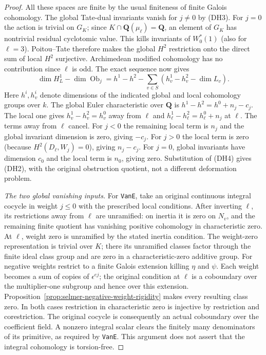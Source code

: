 \begin{proof}
All these spaces are finite by the usual finiteness of finite
Galois cohomology.  The global Tate-dual invariants vanish for
$j\ne0$ by (DH3).  For $j=0$ the action is trivial on $G_K$;
since $K\cap\mathbf Q(\mu_\ell)=\mathbf Q$, an element of $G_K$
has nontrivial residual cyclotomic value.  This kills invariants
of $W_0^*(1)$ (also for $\ell=3$).  Poitou--Tate therefore makes
the global $H^2$ restriction onto the direct sum of local
$H^2$ surjective.  Archimedean modified cohomology has no
contribution since $\ell$ is odd.  The exact sequence now gives
\[
 \dim H^1_L-\dim\operatorname{Ob}_j
 =h^1-h^2-\sum_{v\in S}(h_v^1-h_v^2-\dim L_v).                 \tag{DH5}
\]
Here $h^i,h_v^i$ denote dimensions of the indicated global and
local cohomology groups over $k$.
The global Euler characteristic over $\mathbf Q$ is
$h^1-h^2=h^0+n_j-c_j$.
The local one gives $h_v^1-h_v^2=h_v^0$ away from $\ell$
and $h_\ell^1-h_\ell^2=h_\ell^0+n_j$ at $\ell$.
The terms away from $\ell$ cancel.  For $j<0$ the remaining
local term is $n_j$ and the global invariant dimension is zero,
giving $-c_j$.  For $j>0$ the local term is zero (because
$H^2(D_\ell,W_j)=0$), giving $n_j-c_j$.
For $j=0$, global invariants have dimension $c_0$ and the local
term is $n_0$, giving zero.  Substitution of (DH4) gives (DH2),
with the original obstruction quotient, not a different
deformation problem.

\emph{The two global vanishing inputs.}
For \texttt{VanE}, take an original continuous integral cocycle
in weight $j\le0$ with the prescribed local conditions.
After inverting $\ell$, its restrictions away from $\ell$
are unramified: on inertia it is zero on $N_v$, and the remaining
finite quotient has vanishing positive cohomology in characteristic
zero.  At $\ell$, weight zero is unramified by the stated inertia
condition.  The weight-zero representation is trivial over $K$;
there its unramified classes factor through the finite ideal class
group and are zero in a characteristic-zero additive group.
For negative weights restrict to a finite Galois extension
killing $\eta$ and $\psi$.  Each weight becomes a sum of
copies of $\epsilon^{ej}$; the original condition at $\ell$
is a coboundary over the multiplier-one subgroup and hence
over this extension.  Proposition~\ref{prop:selmer-negative-weight-rigidity}
makes every resulting class zero.  In both cases restriction
in characteristic zero is injective by restriction and corestriction.
The original cocycle is consequently an actual coboundary
over the coefficient field.  A nonzero integral scalar clears
the finitely many denominators of its primitive, as required
by \texttt{VanE}.  This argument does not assert that the
integral cohomology is torsion-free.


\end{proof}
